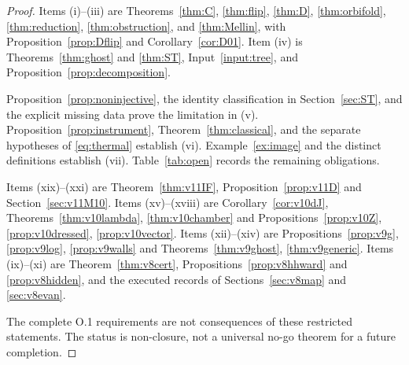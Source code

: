 \documentclass[11pt,a4paper]{article}
\theoremstyle{plain}
\theoremstyle{definition}
\theoremstyle{remark}
\numberwithin{equation}{section}
\begin{document}
\begin{proof}
Items (i)--(iii) are Theorems~\ref{thm:C},
\ref{thm:flip}, \ref{thm:D}, \ref{thm:orbifold},
\ref{thm:reduction}, \ref{thm:obstruction}, and
\ref{thm:Mellin}, with Proposition~\ref{prop:Dflip} and
Corollary~\ref{cor:D01}.
Item (iv) is Theorems~\ref{thm:ghost} and \ref{thm:ST},
Input~\ref{input:tree}, and
Proposition~\ref{prop:decomposition}.

Proposition~\ref{prop:noninjective}, the identity classification
in Section~\ref{sec:ST}, and the explicit missing data prove
the limitation in (v).
Proposition~\ref{prop:instrument},
Theorem~\ref{thm:classical}, and the separate hypotheses of
\eqref{eq:thermal} establish (vi).
Example~\ref{ex:image} and the distinct definitions establish
(vii). Table~\ref{tab:open} records the remaining obligations.

Items (xix)--(xxi) are Theorem~\ref{thm:v11IF},
Proposition~\ref{prop:v11D} and Section~\ref{sec:v11M10}.
Items (xv)--(xviii) are Corollary~\ref{cor:v10dJ},
Theorems~\ref{thm:v10lambda}, \ref{thm:v10chamber} and
Propositions~\ref{prop:v10Z}, \ref{prop:v10dressed},
\ref{prop:v10vector}.
Items (xii)--(xiv) are Propositions~\ref{prop:v9g},
\ref{prop:v9log}, \ref{prop:v9walls} and Theorems~\ref{thm:v9ghost},
\ref{thm:v9generic}.
Items (ix)--(xi) are Theorem~\ref{thm:v8cert},
Propositions~\ref{prop:v8hhward} and \ref{prop:v8hidden}, and the
executed records of Sections~\ref{sec:v8map} and \ref{sec:v8evan}.

The complete O.1 requirements are not consequences of these
restricted statements. The status is non-closure, not a
universal no-go theorem for a future completion.
\end{proof}
\end{document}
